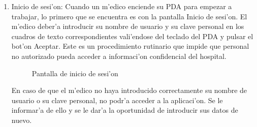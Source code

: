 \begin{enumerate}
\item Inicio de sesi'on: \newline
Cuando un m'edico enciende su PDA para empezar a trabajar, lo primero que se encuentra es con la pantalla Inicio de sesi'on. El m'edico deber'a introducir su nombre de usuario y su clave personal en los cuadros de texto correspondientes vali'endose del teclado del PDA y pulsar el bot'on Aceptar. Este es un procedimiento rutinario que impide que personal no autorizado pueda acceder a informaci'on confidencial del hospital.

\begin{figure}[h!]
	\begin{center}
     	\end{center}
    	\caption{Pantalla de inicio de sesi'on}\label{fig:inicio_sesion}
\end{figure}

En caso de que el m'edico no haya introducido correctamente su nombre de usuario o su clave personal, no podr'a acceder a la aplicaci'on. Se le informar'a de ello y se le dar'a la oportunidad de introducir sus datos de nuevo.


\end{enumerate}
